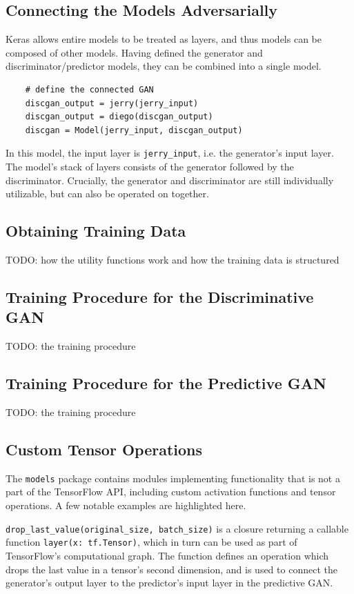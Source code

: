 \documentclass[12pt, titlepage]{report}
\theoremstyle{definition}
\begin{document}
\subsection{Connecting the Models Adversarially}
Keras allows entire models to be treated as layers, and thus models can be composed of other models. Having defined the generator and discriminator/predictor models, they can be combined into a single model.

\begin{verbatim}
    # define the connected GAN
    discgan_output = jerry(jerry_input)
    discgan_output = diego(discgan_output)
    discgan = Model(jerry_input, discgan_output)
\end{verbatim}

In this model, the input layer is \texttt{jerry_input}, i.e. the generator's input layer. The model's stack of layers consists of the generator followed by the discriminator. Crucially, the generator and discriminator are still individually utilizable, but can also be operated on together.

\subsection{Obtaining Training Data}
TODO: how the utility functions work and how the training data is structured
\subsection{Training Procedure for the Discriminative GAN}
TODO: the training procedure
\subsection{Training Procedure for the Predictive GAN}
TODO: the training procedure
\subsection{Custom Tensor Operations}\label{subsection:custom_ops}
The \texttt{models} package contains modules implementing functionality that is not a part of the TensorFlow API, including custom activation functions and tensor operations. A few notable examples are highlighted here.

\texttt{drop_last_value(original_size, batch_size)} is a closure returning a callable function \texttt{layer(x: tf.Tensor)}, which in turn can be used as part of TensorFlow's computational graph. The function defines an operation which drops the last value in a tensor's second dimension, and is used to connect the generator's output layer to the predictor's input layer in the predictive GAN.
\end{document}
